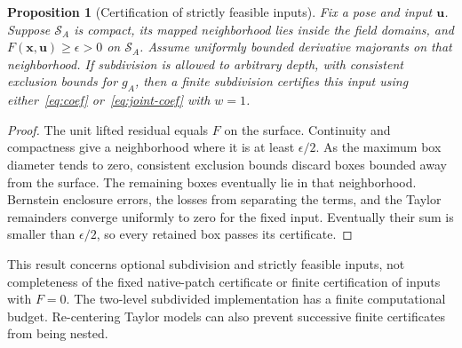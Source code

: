 \documentclass[journal]{IEEEtran}
\newtheorem{proposition}{Proposition}
\theoremstyle{definition}
\begin{document}
\begin{proposition}[Certification of strictly feasible inputs]\label{prop:complete}
Fix a pose and input $\mathbf u$. Suppose $\mathcal S_A$ is compact, its mapped neighborhood lies
inside the field domains, and $F(\mathbf x,\mathbf u)\ge\epsilon>0$ on $\mathcal S_A$.
Assume uniformly bounded derivative majorants on that neighborhood. If subdivision is allowed
to arbitrary depth, with consistent exclusion bounds for $g_A$, then a finite subdivision
certifies this input using either~\eqref{eq:coef} or~\eqref{eq:joint-coef} with $w=1$.
\end{proposition}
\begin{proof}
The unit lifted residual equals $F$ on the surface. Continuity and compactness give a neighborhood
where it is at least $\epsilon/2$. As the maximum box diameter tends to zero, consistent exclusion
bounds discard boxes bounded away from the surface. The remaining boxes eventually lie in that
neighborhood. Bernstein enclosure errors, the losses from separating the terms, and the Taylor
remainders converge uniformly to zero for the fixed input. Eventually their sum is smaller than
$\epsilon/2$, so every retained box passes its certificate.
\end{proof}
This result concerns optional subdivision and strictly feasible inputs, not completeness of the
fixed native-patch certificate or finite certification of inputs with $F=0$.
The two-level subdivided implementation has a finite computational budget. Re-centering Taylor models can
also prevent successive finite certificates from being nested.

\end{document}
